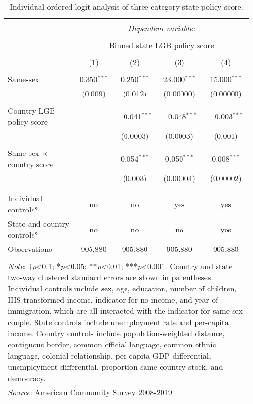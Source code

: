 \documentclass[
  11pt,
]{article}
\begin{document}
\begin{table}[!htbp] \centering 
  \caption{Individual ordered logit analysis of three-category state policy score.} 
  \label{tab:ord} 
\begin{tabular}{@{\extracolsep{5pt}}lcccc} 
\\[-1.8ex]\hline 
\hline \\[-1.8ex] 
 & \multicolumn{4}{c}{\textit{Dependent variable:}} \\ 
\cline{2-5} 
\\[-1.8ex] & \multicolumn{4}{c}{Binned state LGB policy score} \\ 
\\[-1.8ex] & (1) & (2) & (3) & (4)\\ 
\hline \\[-1.8ex] 
 Same-sex & 0.350$^{***}$ & 0.250$^{***}$ & 23.000$^{***}$ & 15.000$^{***}$ \\ 
  & (0.009) & (0.012) & (0.00000) & (0.00000) \\ 
  & & & & \\ 
 Country LGB policy score &  & $-$0.041$^{***}$ & $-$0.048$^{***}$ & $-$0.003$^{***}$ \\ 
  &  & (0.0003) & (0.0003) & (0.001) \\ 
  & & & & \\ 
 Same-sex × country score &  & 0.054$^{***}$ & 0.050$^{***}$ & 0.008$^{***}$ \\ 
  &  & (0.003) & (0.00004) & (0.00002) \\ 
  & & & & \\ 
\hline \\[-1.8ex] 
Individual controls? & no & no & yes & yes \\ 
State and country controls? & no & no & no & yes \\ 
Observations & 905,880 & 905,880 & 905,880 & 905,880 \\ 
\hline 
\hline \\[-1.8ex] 
\multicolumn{5}{l}{\parbox[t]{.8\textwidth}{\textit{Note}: †\textit{p}<0.1; *\textit{p}<0.05; **\textit{p}<0.01; ***\textit{p}<0.001. Country and state two-way clustered standard errors are shown in parentheses. Individual controls include sex, age, education, number of children, IHS-transformed income, indicator for no income, and year of immigration, which are all interacted with the indicator for same-sex couple. State controls include unemployment rate and per-capita income. Country controls include population-weighted distance, contiguous border, common official language, common ethnic language, colonial relationship, per-capita GDP differential, unemployment differential, proportion same-country stock, and democracy.}} \\ 
\multicolumn{5}{l}{\textit{Source}: American Community Survey 2008-2019} \\ 
\end{tabular} 
\end{table}
\end{document}
